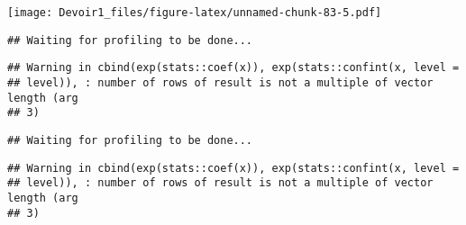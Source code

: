 \documentclass[]{article}
\newenvironment{Shaded}{\begin{snugshade}}{\end{snugshade}}
\newcommand{\KeywordTok}[1]{\textcolor[rgb]{0.13,0.29,0.53}{\textbf{#1}}}
\newcommand{\DataTypeTok}[1]{\textcolor[rgb]{0.13,0.29,0.53}{#1}}
\newcommand{\DecValTok}[1]{\textcolor[rgb]{0.00,0.00,0.81}{#1}}
\newcommand{\StringTok}[1]{\textcolor[rgb]{0.31,0.60,0.02}{#1}}
\newcommand{\OperatorTok}[1]{\textcolor[rgb]{0.81,0.36,0.00}{\textbf{#1}}}
\newcommand{\NormalTok}[1]{#1}
\begin{document}
\texttt{[image: Devoir1\_files/figure-latex/unnamed-chunk-83-5.pdf]}

\begin{Shaded}
\end{Shaded}

\begin{verbatim}
## Waiting for profiling to be done...
\end{verbatim}

\begin{verbatim}
## Warning in cbind(exp(stats::coef(x)), exp(stats::confint(x, level =
## level)), : number of rows of result is not a multiple of vector length (arg
## 3)
\end{verbatim}

\begin{verbatim}
## Waiting for profiling to be done...
\end{verbatim}

\begin{verbatim}
## Warning in cbind(exp(stats::coef(x)), exp(stats::confint(x, level =
## level)), : number of rows of result is not a multiple of vector length (arg
## 3)
\end{verbatim}
\end{document}
